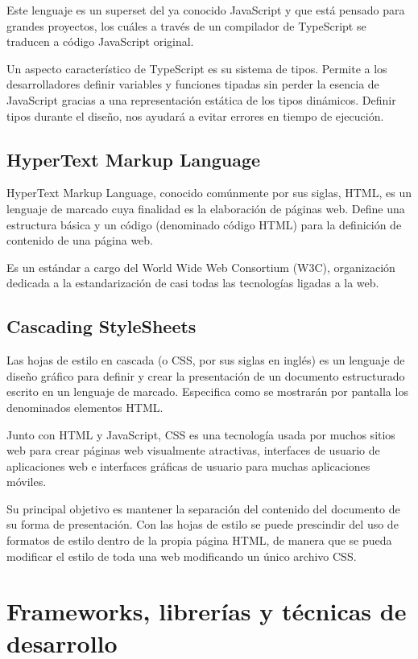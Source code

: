 Este lenguaje es un superset del ya conocido JavaScript y que está pensado para grandes proyectos, los cuáles a través de un compilador de TypeScript se traducen a código JavaScript original.

Un aspecto característico de TypeScript es su sistema de tipos. Permite a los desarrolladores definir variables y funciones tipadas sin perder la esencia de JavaScript gracias a una representación estática de los tipos dinámicos. Definir tipos durante el diseño, nos ayudará a evitar errores en tiempo de ejecución.

\subsection{HyperText Markup Language}
HyperText Markup Language, conocido comúnmente por sus siglas, HTML, es un lenguaje de marcado cuya finalidad es la elaboración de páginas web. Define una estructura básica y un código (denominado código HTML) para la definición de contenido de una página web. 

Es un estándar a cargo del World Wide Web Consortium (W3C), organización dedicada a la estandarización de casi todas las tecnologías ligadas a la web.

\subsection{Cascading StyleSheets}
Las hojas de estilo en cascada (o CSS, por sus siglas en inglés) es un lenguaje de diseño gráfico para definir y crear la presentación de un documento estructurado escrito en un lenguaje de marcado. Especifica como se mostrarán por pantalla los denominados elementos HTML.

Junto con HTML y JavaScript, CSS es una tecnología usada por muchos sitios web para crear páginas web visualmente atractivas, interfaces de usuario de aplicaciones web e interfaces gráficas de usuario para muchas aplicaciones móviles.

Su principal objetivo es mantener la separación del contenido del documento de su forma de presentación. Con las hojas de estilo se puede prescindir del uso de formatos de estilo dentro de la propia página HTML, de manera que se pueda modificar el estilo de toda una web modificando un único archivo CSS.




\section{Frameworks, librerías y técnicas de desarrollo}
